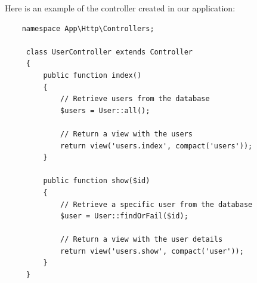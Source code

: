 \medskip Here is an example of the controller created in our application:
\begin{verbatim}
    namespace App\Http\Controllers;

     class UserController extends Controller
     {
         public function index()
         {
             // Retrieve users from the database
             $users = User::all();

             // Return a view with the users
             return view('users.index', compact('users'));
         }

         public function show($id)
         {
             // Retrieve a specific user from the database
             $user = User::findOrFail($id);

             // Return a view with the user details
             return view('users.show', compact('user'));
         }
     }
\end{verbatim}

